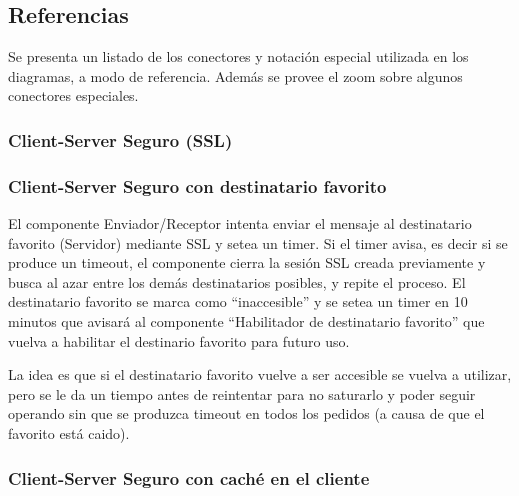 \subsection{Referencias}

Se presenta un listado de los conectores y notación especial utilizada en los diagramas, a modo de referencia. Además se provee el zoom sobre algunos conectores especiales.


\subsubsection{Client-Server Seguro (SSL)}



\subsubsection{Client-Server Seguro con destinatario favorito}


El componente Enviador/Receptor intenta enviar el mensaje
al destinatario favorito (Servidor) mediante SSL y setea un timer.
Si el timer avisa, es decir si se produce un timeout, el componente
cierra la sesión SSL creada previamente y busca al azar entre los
demás destinatarios posibles, y repite el proceso. El destinatario
favorito se marca como ``inaccesible'' y se setea un timer en 10
minutos que avisará al componente ``Habilitador de destinatario
favorito'' que vuelva a habilitar el destinario favorito para
futuro uso.

La idea es que si el destinatario favorito vuelve a ser accesible se
vuelva a utilizar, pero se le da un tiempo antes de reintentar para
no saturarlo y poder seguir operando sin que se produzca timeout
en todos los pedidos (a causa de que el favorito está caido).

\subsubsection{Client-Server Seguro con caché en el cliente}


